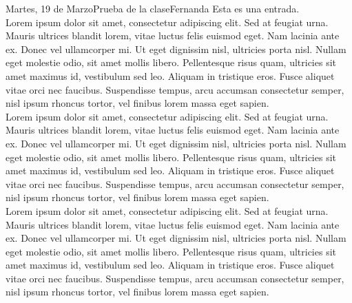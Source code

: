 \documentclass{logbook}
\begin{document}
\makeCoverPage{}


\begin{entry}{Martes, 19 de Marzo}{Prueba de la clase}{Fernanda}
Esta es una entrada. \\

Lorem ipsum dolor sit amet, consectetur adipiscing elit. Sed at feugiat urna. Mauris ultrices blandit lorem, vitae luctus felis euismod eget. Nam lacinia ante ex. Donec vel ullamcorper mi. Ut eget dignissim nisl, ultricies porta nisl. Nullam eget molestie odio, sit amet mollis libero. Pellentesque risus quam, ultricies sit amet maximus id, vestibulum sed leo. Aliquam in tristique eros. Fusce aliquet vitae orci nec faucibus. Suspendisse tempus, arcu accumsan consectetur semper, nisl ipsum rhoncus tortor, vel finibus lorem massa eget sapien. \\

Lorem ipsum dolor sit amet, consectetur adipiscing elit. Sed at feugiat urna. Mauris ultrices blandit lorem, vitae luctus felis euismod eget. Nam lacinia ante ex. Donec vel ullamcorper mi. Ut eget dignissim nisl, ultricies porta nisl. Nullam eget molestie odio, sit amet mollis libero. Pellentesque risus quam, ultricies sit amet maximus id, vestibulum sed leo. Aliquam in tristique eros. Fusce aliquet vitae orci nec faucibus. Suspendisse tempus, arcu accumsan consectetur semper, nisl ipsum rhoncus tortor, vel finibus lorem massa eget sapien. \\

Lorem ipsum dolor sit amet, consectetur adipiscing elit. Sed at feugiat urna. Mauris ultrices blandit lorem, vitae luctus felis euismod eget. Nam lacinia ante ex. Donec vel ullamcorper mi. Ut eget dignissim nisl, ultricies porta nisl. Nullam eget molestie odio, sit amet mollis libero. Pellentesque risus quam, ultricies sit amet maximus id, vestibulum sed leo. Aliquam in tristique eros. Fusce aliquet vitae orci nec faucibus. Suspendisse tempus, arcu accumsan consectetur semper, nisl ipsum rhoncus tortor, vel finibus lorem massa eget sapien. \\
\end{entry}
\end{document}
